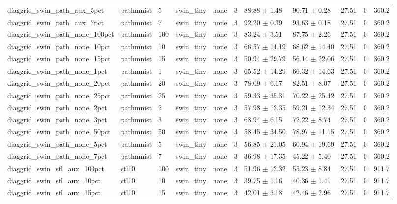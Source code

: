 \begin{tabular}{lllllllllll}
diaggrid_swin_path_aux_5pct & pathmnist & 5 & swin_tiny & none & 3 & 88.88 $\pm$ 1.48 & 90.71 $\pm$ 0.28 & 27.51 & 0 & 360.2 \\
diaggrid_swin_path_aux_7pct & pathmnist & 7 & swin_tiny & none & 3 & 92.20 $\pm$ 0.39 & 93.63 $\pm$ 0.18 & 27.51 & 0 & 360.2 \\
diaggrid_swin_path_none_100pct & pathmnist & 100 & swin_tiny & none & 3 & 83.24 $\pm$ 3.51 & 87.75 $\pm$ 2.26 & 27.51 & 0 & 360.2 \\
diaggrid_swin_path_none_10pct & pathmnist & 10 & swin_tiny & none & 3 & 66.57 $\pm$ 14.19 & 68.62 $\pm$ 14.40 & 27.51 & 0 & 360.2 \\
diaggrid_swin_path_none_15pct & pathmnist & 15 & swin_tiny & none & 3 & 50.94 $\pm$ 29.79 & 56.14 $\pm$ 22.06 & 27.51 & 0 & 360.2 \\
diaggrid_swin_path_none_1pct & pathmnist & 1 & swin_tiny & none & 3 & 65.52 $\pm$ 14.29 & 66.32 $\pm$ 14.63 & 27.51 & 0 & 360.2 \\
diaggrid_swin_path_none_20pct & pathmnist & 20 & swin_tiny & none & 3 & 78.09 $\pm$ 6.17 & 82.51 $\pm$ 8.07 & 27.51 & 0 & 360.2 \\
diaggrid_swin_path_none_25pct & pathmnist & 25 & swin_tiny & none & 3 & 59.33 $\pm$ 35.31 & 70.22 $\pm$ 25.42 & 27.51 & 0 & 360.2 \\
diaggrid_swin_path_none_2pct & pathmnist & 2 & swin_tiny & none & 3 & 57.98 $\pm$ 12.35 & 59.21 $\pm$ 12.34 & 27.51 & 0 & 360.2 \\
diaggrid_swin_path_none_3pct & pathmnist & 3 & swin_tiny & none & 3 & 68.94 $\pm$ 6.15 & 72.22 $\pm$ 8.74 & 27.51 & 0 & 360.2 \\
diaggrid_swin_path_none_50pct & pathmnist & 50 & swin_tiny & none & 3 & 58.45 $\pm$ 34.50 & 78.97 $\pm$ 11.15 & 27.51 & 0 & 360.2 \\
diaggrid_swin_path_none_5pct & pathmnist & 5 & swin_tiny & none & 3 & 56.85 $\pm$ 21.05 & 60.94 $\pm$ 19.69 & 27.51 & 0 & 360.2 \\
diaggrid_swin_path_none_7pct & pathmnist & 7 & swin_tiny & none & 3 & 36.98 $\pm$ 17.35 & 45.22 $\pm$ 5.40 & 27.51 & 0 & 360.2 \\
diaggrid_swin_stl_aux_100pct & stl10 & 100 & swin_tiny & none & 3 & 51.96 $\pm$ 12.32 & 55.23 $\pm$ 8.84 & 27.51 & 0 & 911.7 \\
diaggrid_swin_stl_aux_10pct & stl10 & 10 & swin_tiny & none & 3 & 39.75 $\pm$ 1.16 & 40.36 $\pm$ 1.41 & 27.51 & 0 & 911.7 \\
diaggrid_swin_stl_aux_15pct & stl10 & 15 & swin_tiny & none & 3 & 42.01 $\pm$ 3.18 & 42.46 $\pm$ 2.96 & 27.51 & 0 & 911.7 \\

\end{tabular}

